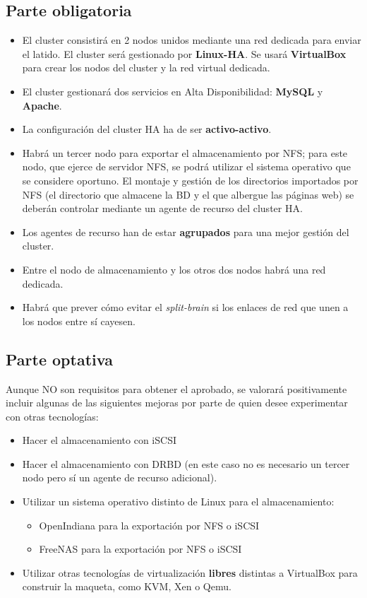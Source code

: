\documentclass[a4paper,10pt]{article}
\begin{document}
\subsection{Parte obligatoria}
\begin{itemize}
\item El cluster consistirá en 2 nodos unidos mediante una red dedicada para enviar el latido. El cluster será gestionado por \textbf{Linux-HA}. Se usará \textbf{Virtual\-Box} para crear los nodos del cluster y la red virtual dedicada.
\item El cluster gestionará dos servicios en Alta Disponibilidad: \textbf{MySQL} y \textbf{Apache}.
\item La configuración del cluster HA ha de ser \textbf{activo-activo}. 
\item Habrá un tercer nodo para exportar el almacenamiento por NFS; para este nodo, que ejerce de servidor NFS, se podrá utilizar el sistema operativo que se considere oportuno. El montaje y gestión de los directorios importados por NFS (el directorio que almacene la BD y el que albergue las páginas web) se deberán controlar mediante un agente de recurso del cluster HA.
\item Los agentes de recurso han de estar \textbf{agrupados} para una mejor gestión del cluster.
\item Entre el nodo de almacenamiento y los otros dos nodos habrá una red dedicada.
\item Habrá que prever cómo evitar el \textit{split-brain} si los enlaces de red que unen a los nodos entre sí cayesen.
\end{itemize}

\subsection{Parte optativa}

Aunque NO son requisitos para obtener el aprobado, se valorará positivamente incluir algunas de las siguientes mejoras por parte de quien desee ex\-peri\-mentar con otras tecnologías:

\begin{itemize}
\item Hacer el almacenamiento con iSCSI
\item Hacer el almacenamiento con DRBD (en este caso no es necesario un tercer nodo pero sí un agente de recurso adicional).
\item Utilizar un sistema operativo distinto de Linux para el almacenamiento:
	\begin{itemize}
	\item OpenIndiana para la exportación por NFS o iSCSI
	\item FreeNAS para la exportación por NFS o iSCSI
	\end{itemize}
\item Utilizar otras tecnologías de virtualización \textbf{libres} distintas a VirtualBox para construir la maqueta, como KVM, Xen o Qemu.
\end{itemize}
\end{document}
